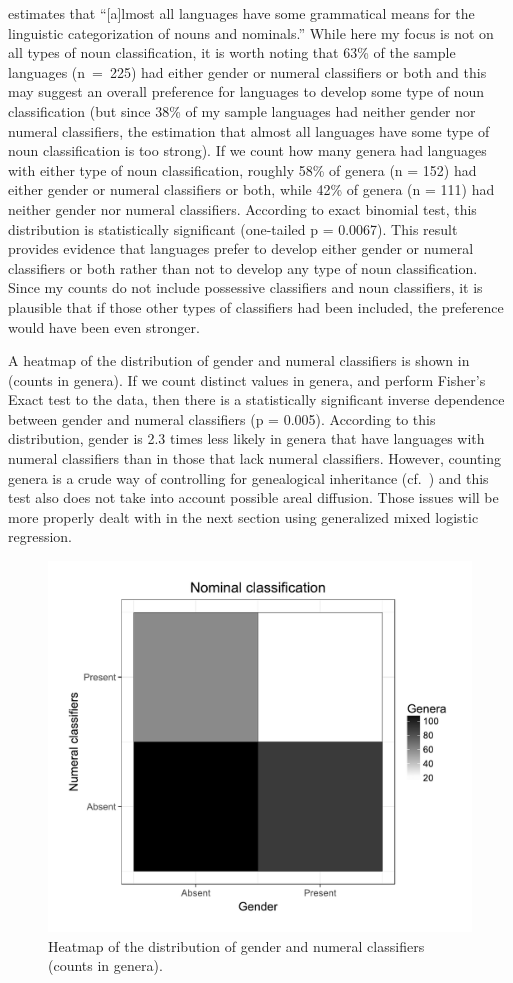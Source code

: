 \documentclass[output=collectionpaper]{langsci/langscibook}
\begin{document}
\citet[1]{Aikhenvald2000} estimates that ``[a]lmost all languages have some grammatical means for the linguistic categorization of nouns and nominals.'' While here my focus is not on all types of noun classification, it is worth noting that 63\% of the sample languages (n~=~225) had either gender or numeral classifiers or both and this may suggest an overall preference for languages to develop some type of noun classification (but since 38\% of my sample languages had neither gender nor numeral classifiers, the estimation that almost all languages have some type of noun classification is too strong). If we count how many genera had languages with either type of noun classification, roughly 58\% of genera (n = 152) had either gender or numeral classifiers or both, while 42\% of genera (n = 111) had neither gender nor numeral classifiers. According to exact binomial test, this distribution is statistically significant (one-tailed p = 0.0067). This result provides evidence that languages prefer to develop either gender or numeral classifiers or both rather than not to develop any type of noun classification. Since my counts do not include possessive classifiers and noun classifiers, it is plausible that if those other types of classifiers had been included, the preference would have been even stronger.

A heatmap of the distribution of gender and numeral classifiers is shown in  (counts in genera). If we count distinct values in genera, and perform Fisher's Exact test to the data, then there is a statistically significant inverse dependence between gender and numeral classifiers (p = 0.005). According to this distribution, gender is 2.3 times less likely in genera that have languages with numeral classifiers than in those that lack numeral classifiers. However, counting genera is a crude way of controlling for genealogical inheritance (cf.\ ) and this test also does not take into account possible areal diffusion. Those issues will be more properly dealt with in the next section using generalized mixed logistic regression.

\begin{figure}
\includegraphics[width=.6\textwidth]{figures/13/Fig3_heatmap}
\caption{%
Heatmap of the distribution of gender and numeral classifiers (counts in genera).
}%
\label{fig:Sinne:3}
\end{figure}
\end{document}
